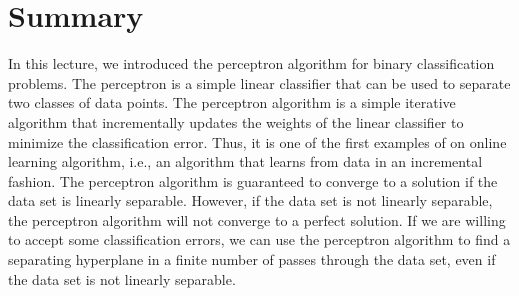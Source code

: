 \documentclass{article}[11pt]
\begin{document}
\section{Summary}
In this lecture, we introduced the perceptron algorithm for binary classification problems.
The perceptron is a simple linear classifier that can be used to separate two classes of data points.
The perceptron algorithm is a simple iterative algorithm that incrementally updates the weights of the linear classifier to minimize the classification error.
Thus, it is one of the first examples of on online learning algorithm, i.e., an algorithm that learns from data in an incremental fashion.
The perceptron algorithm is guaranteed to converge to a solution if the data set is linearly separable.
However, if the data set is not linearly separable, the perceptron algorithm will not converge to a perfect solution.
If we are willing to accept some classification errors, we can use the perceptron algorithm to find a separating hyperplane in a finite number of passes through the data set, 
even if the data set is not linearly separable.


\end{document}
